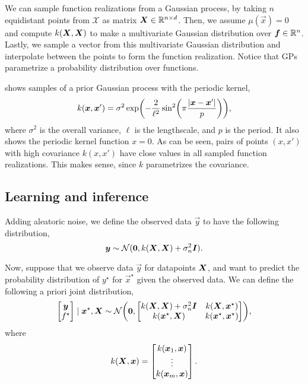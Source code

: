 We can sample function realizations from a Gaussian process, by taking $n$
equidistant points from $\mathcal{X}$ as matrix $\bm{X}\in\mathbb{R}^{n\times d}$.
Then, we assume $\mu(\vec{x}) = 0$ and compute $k(\bm{X},\bm{X})$ to make a
multivariate Gaussian distribution over $\bm{f}\in\mathbb{R}^n$. Lastly, we sample a
vector from this multivariate Gaussian distribution and interpolate between the
points to form the function realization. Notice that GPs parametrize a
probability distribution over functions.

 shows samples of a prior Gaussian process with the periodic
kernel, \[
  k(\vec{x},\vec{x}') = \sigma^2 \exp \lft( -\frac{2}{\ell^2}\sin^2\lft(\pi
  \frac{|\vec{x}-\vec{x}'|}{p} \rgt) \rgt)
,\]
where $\sigma^2$ is the overall variance, $\ell$ is the lengthscale, and $p$ is
the period. It also shows the periodic kernel function \wrt $x=0$. As can be
seen, pairs of points $(x,x')$ with high covariance $k(x,x')$ have close values
in all sampled function realizations. This makes sense, since $k$ parametrizes
the covariance.

\subsection{Learning and inference}

Adding aleatoric noise, we define the observed data $\vec{y}$ to have the
following distribution, \[
  \bm{y} \sim \mathcal{N}(\bm{0}, k(\bm{X}, \bm{X}) + \sigma_n^2\bm{I})
.\]

Now, suppose that we observe data $\vec{y}$ for datapoints $\bm{X}$, and want
to predict the probability distribution of $y^\star$ for $\vec{x}^\star$ given
the observed data. We can define the following a priori joint
distribution, \[
  \begin{bmatrix}
    \vec{y} \\
    f^\star
  \end{bmatrix} \mid \vec{x}^\star, \vec{X}
  \sim
  \mathcal{N} \lft(
  \vec{0},
  \begin{bmatrix}
    k(\mat{X},\mat{X}) + \sigma_n^2\mat{I} & k(\mat{X},\vec{x}^\star) \\
    k(\vec{x}^\star,\mat{X}) & k(\vec{x}^\star, \vec{x}^\star)
  \end{bmatrix} \rgt)
,\]
where \[
  k(\bm{X},\bm{x}) = \begin{bmatrix} k(\bm{x}_1,\bm{x}) \\ \vdots \\
  k(\bm{x}_m,\bm{x}) \end{bmatrix}
.\]

